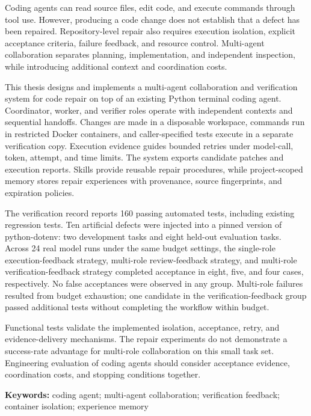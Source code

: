 Coding agents can read source files, edit code, and execute commands through tool use. However, producing a code change does not establish that a defect has been repaired. Repository-level repair also requires execution isolation, explicit acceptance criteria, failure feedback, and resource control. Multi-agent collaboration separates planning, implementation, and independent inspection, while introducing additional context and coordination costs.

This thesis designs and implements a multi-agent collaboration and verification system for code repair on top of an existing Python terminal coding agent. Coordinator, worker, and verifier roles operate with independent contexts and sequential handoffs. Changes are made in a disposable workspace, commands run in restricted Docker containers, and caller-specified tests execute in a separate verification copy. Execution evidence guides bounded retries under model-call, token, attempt, and time limits. The system exports candidate patches and execution reports. Skills provide reusable repair procedures, while project-scoped memory stores repair experiences with provenance, source fingerprints, and expiration policies.

The verification record reports 160 passing automated tests, including existing regression tests. Ten artificial defects were injected into a pinned version of python-dotenv: two development tasks and eight held-out evaluation tasks. Across 24 real model runs under the same budget settings, the single-role execution-feedback strategy, multi-role review-feedback strategy, and multi-role verification-feedback strategy completed acceptance in eight, five, and four cases, respectively. No false acceptances were observed in any group. Multi-role failures resulted from budget exhaustion; one candidate in the verification-feedback group passed additional tests without completing the workflow within budget.

Functional tests validate the implemented isolation, acceptance, retry, and evidence-delivery mechanisms. The repair experiments do not demonstrate a success-rate advantage for multi-role collaboration on this small task set. Engineering evaluation of coding agents should consider acceptance evidence, coordination costs, and stopping conditions together.

\textbf{Keywords:} coding agent; multi-agent collaboration; verification feedback; container isolation; experience memory

